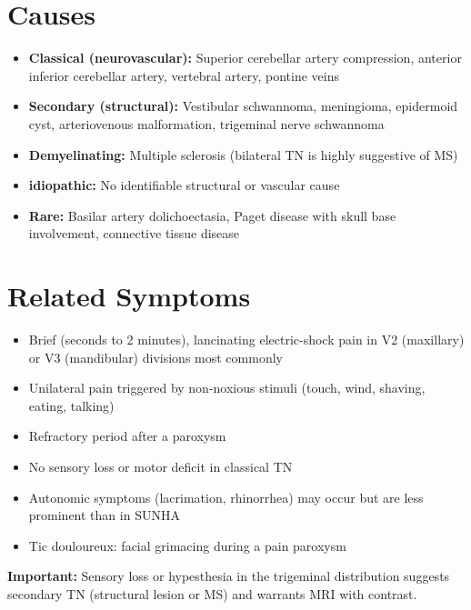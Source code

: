 \section*{Causes}
\begin{itemize}
  \item \textbf{Classical (neurovascular):} Superior cerebellar artery compression, anterior inferior cerebellar artery, vertebral artery, pontine veins
  \item \textbf{Secondary (structural):} Vestibular schwannoma, meningioma, epidermoid cyst, arteriovenous malformation, trigeminal nerve schwannoma
  \item \textbf{Demyelinating:} Multiple sclerosis (bilateral TN is highly suggestive of MS)
  \item \textbf{idiopathic:} No identifiable structural or vascular cause
  \item \textbf{Rare:} Basilar artery dolichoectasia, Paget disease with skull base involvement, connective tissue disease
\end{itemize}

\section*{Related Symptoms}
\begin{itemize}
  \item Brief (seconds to 2 minutes), lancinating electric-shock pain in V2 (maxillary) or V3 (mandibular) divisions most commonly
  \item Unilateral pain triggered by non-noxious stimuli (touch, wind, shaving, eating, talking)
  \item Refractory period after a paroxysm
  \item No sensory loss or motor deficit in classical TN
  \item Autonomic symptoms (lacrimation, rhinorrhea) may occur but are less prominent than in SUNHA
  \item Tic douloureux: facial grimacing during a pain paroxysm
\end{itemize}
\textbf{Important:} Sensory loss or hypesthesia in the trigeminal distribution suggests secondary TN (structural lesion or MS) and warrants MRI with contrast.


